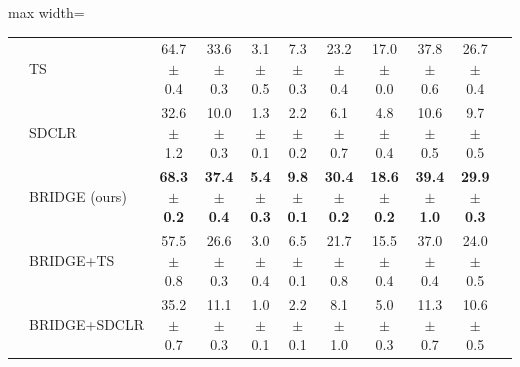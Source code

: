 \begin{table}[t]
\begin{adjustbox}{max width=\textwidth}
\begin{tabular}{l l c c c c c c c c c}
 & TS & 64.7 {\scriptsize$\pm$ 0.4} & 33.6 {\scriptsize$\pm$ 0.3} & 3.1 {\scriptsize$\pm$ 0.5} & 7.3 {\scriptsize$\pm$ 0.3} & 23.2 {\scriptsize$\pm$ 0.4} & 17.0 {\scriptsize$\pm$ 0.0} & 37.8 {\scriptsize$\pm$ 0.6} & 26.7 {\scriptsize$\pm$ 0.4} \\
 & SDCLR & 32.6 {\scriptsize$\pm$ 1.2} & 10.0 {\scriptsize$\pm$ 0.3} & 1.3 {\scriptsize$\pm$ 0.1} & 2.2 {\scriptsize$\pm$ 0.2} & 6.1 {\scriptsize$\pm$ 0.7} & 4.8 {\scriptsize$\pm$ 0.4} & 10.6 {\scriptsize$\pm$ 0.5} & 9.7 {\scriptsize$\pm$ 0.5} \\
\rowcolor{blue!10}  & BRIDGE (ours) & \textbf{68.3 {\scriptsize$\pm$ 0.2}} & \textbf{37.4 {\scriptsize$\pm$ 0.4}} & \textbf{5.4 {\scriptsize$\pm$ 0.3}} & \textbf{9.8 {\scriptsize$\pm$ 0.1}} & \textbf{30.4 {\scriptsize$\pm$ 0.2}} & \textbf{18.6 {\scriptsize$\pm$ 0.2}} & \textbf{39.4 {\scriptsize$\pm$ 1.0}} & \textbf{29.9 {\scriptsize$\pm$ 0.3}} \\
 & BRIDGE+TS & 57.5 {\scriptsize$\pm$ 0.8} & 26.6 {\scriptsize$\pm$ 0.3} & 3.0 {\scriptsize$\pm$ 0.4} & 6.5 {\scriptsize$\pm$ 0.1} & 21.7 {\scriptsize$\pm$ 0.8} & 15.5 {\scriptsize$\pm$ 0.4} & 37.0 {\scriptsize$\pm$ 0.4} & 24.0 {\scriptsize$\pm$ 0.5} \\
 & BRIDGE+SDCLR & 35.2 {\scriptsize$\pm$ 0.7} & 11.1 {\scriptsize$\pm$ 0.3} & 1.0 {\scriptsize$\pm$ 0.1} & 2.2 {\scriptsize$\pm$ 0.1} & 8.1 {\scriptsize$\pm$ 1.0} & 5.0 {\scriptsize$\pm$ 0.3} & 11.3 {\scriptsize$\pm$ 0.7} & 10.6 {\scriptsize$\pm$ 0.5} \\
\bottomrule
\end{tabular}
\end{adjustbox}
\end{table}
